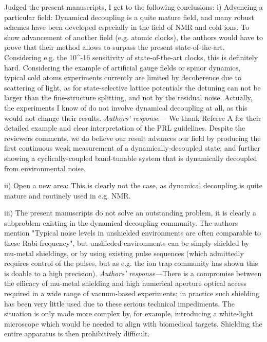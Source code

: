 \documentclass[letterpaper]{article}
\newenvironment{refcomment}{\singlespacing\verbatim}{\endverbatim}
\newcommand{\response}{\emph{Authors' response---}}
\begin{document}
\begin{refcomment}
Judged the present manuscripts, I get to the following conclusions: i)
Advancing a particular field: Dynamical decoupling is a quite mature
field, and many robust schemes have been developed especially in the
field of NMR and cold ions. To show advancement of another field (e.g.
atomic clocks), the authors would have to prove that their method
allows to surpass the present state-of-the-art. Considering e.g. the
10^-16 sensitivity of state-of-the-art clocks, this is definitely
hard. Considering the example of artificial gauge fields or spinor
dynamics, typical cold atoms experiments currently are limited by
decoherence due to scattering of light, as for state-selective lattice
potentials the detuning can not be larger than the fine-structure
splitting, and not by the residual noise. Actually, the experiments I
know of do not involve dynamical decoupling at all, as this would not
change their results.
\end{refcomment}
\response 
We thank Referee A for their detailed example and clear interpretation of the PRL guidelines.
Despite the reviewers comments, we do believe our result advances our field by producing the first continuous weak measurement of a dynamically-decoupled state; and further showing a cyclically-coupled band-tunable system that is dynamically decoupled from environmental noise.

\newpage
\begin{refcomment}
ii) Open a new area: This is clearly not the case, as dynamical
decoupling is quite mature and routinely used in e.g. NMR.

iii) The present manuscripts do not solve an outstanding problem, it
is clearly a subproblem existing in the dynamical decoupling
community. The authors mention "Typical noise levels in
unshielded environments are often comparable to these
Rabi frequency", but unshieded environments can be simply shielded
by mu-metal shieldings, or by using existing pulse sequences (which
admittedly requires control of the pulses, but as e.g. the ion trap
community has shown this is doable to a high precision).
\end{refcomment}
\response There is a compromise between the efficacy of mu-metal shielding and high numerical aperture optical access required in a wide range of vacuum-based experiments; in practice such shielding has been very little used due to these serious technical impediments. The situation is only made more complex by, for example, introducing a white-light microscope which would be needed to align with biomedical targets. Shielding the entire apparatus is then prohibitively difficult.
\end{document}
